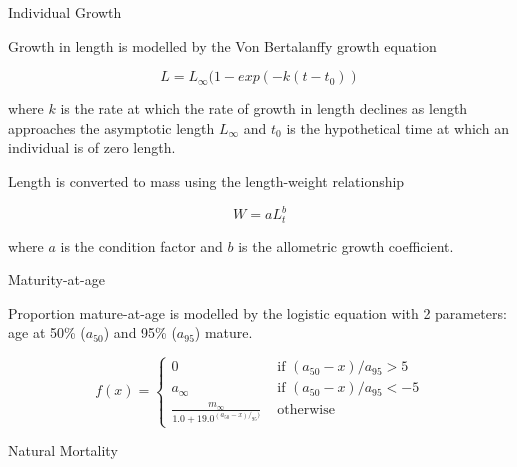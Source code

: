 \documentclass[preprint,review,12pt]{elsarticle}
\begin{document}
Individual Growth

Growth in length is modelled by the Von Bertalanffy growth equation \cite{vonbert1957quantitative}

\begin{equation} L = L_\infty(1 - exp(-k(t-t_0)) \end{equation}
         
where $k$ is the rate at which the rate of growth in length declines as length approaches the asymptotic length  $L_\infty$ and $t_{0}$ is the hypothetical time at which an individual is of zero length.

Length is converted to mass using the length-weight relationship 
    
\begin{equation} W = aL_t^b \end{equation}

\noindent where $a$ is the condition factor and $b$ is the allometric growth coefficient.


Maturity-at-age

Proportion mature-at-age is modelled by the logistic equation with 2 parameters: age at 50\% ($a_{50}$) and 95\% ($a_{95}$) mature.

\begin{equation}
f(x) = \left\{ \begin{array}{ll}
			0                                 &\mbox{ if $(a_{50}-x)/a_{95} >  5$} \\
			a_{\infty}                        &\mbox{ if $(a_{50}-x)/a_{95} < -5$} \\
			\frac{m_{\infty}}{1.0+19.0^{(a_{50}-x)/_{95})}} &\mbox{ otherwise}
		\end{array}
       \right.
\end{equation}


Natural Mortality
\end{document}
